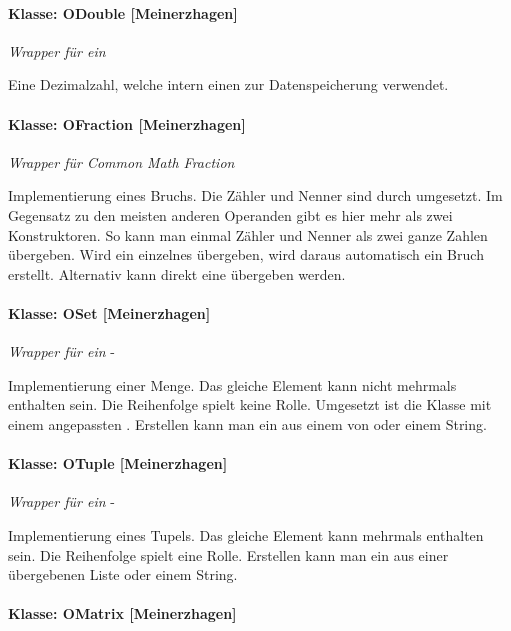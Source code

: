 \paragraph{Klasse: ODouble [Meinerzhagen]}

\textit{Wrapper für ein }

Eine Dezimalzahl, welche intern einen  zur Datenspeicherung verwendet.


\paragraph{Klasse: OFraction [Meinerzhagen]}

\textit{Wrapper für Common Math Fraction}

Implementierung eines Bruchs. Die Zähler und Nenner sind durch  umgesetzt. Im Gegensatz zu den meisten anderen Operanden gibt es hier mehr als zwei Konstruktoren. So kann man einmal Zähler und Nenner als zwei ganze Zahlen übergeben. Wird ein einzelnes  übergeben, wird daraus automatisch ein Bruch erstellt. Alternativ kann direkt eine  übergeben werden.

\paragraph{Klasse: OSet [Meinerzhagen]}

\textit{Wrapper für ein} -

Implementierung einer Menge. Das gleiche Element kann nicht mehrmals enthalten sein. Die Reihenfolge spielt keine Rolle. Umgesetzt ist die Klasse mit einem angepassten . Erstellen kann man ein  aus einem  von  oder einem String.

\paragraph{Klasse: OTuple [Meinerzhagen]}

\textit{Wrapper für ein} -

Implementierung eines Tupels. Das gleiche Element kann mehrmals enthalten sein. Die Reihenfolge spielt eine Rolle. Erstellen kann man ein  aus einer übergebenen Liste oder einem String.

\paragraph{Klasse: OMatrix [Meinerzhagen]}

